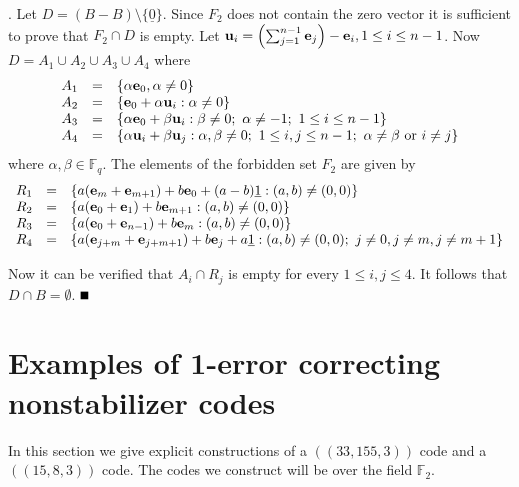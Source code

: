 \documentclass{Rinton-P9x6}
\newcommand{\GF}[2][]{{\ensuremath{\mathbb{F}_{#2}^{#1}}}}
\newcommand{\bproof}{\noindent{\it Proof}}
\newcommand{\eproof}{\hspace*{\fill}$\rule{2mm}{2mm}$~~~~~\bigskip}
\renewenvironment{proof}{\bproof. }{\eproof}
\newcommand{\e}{{\bf e}}
\renewcommand{\u}{{\bf u}}
\begin{document}
\begin{proof}
  Let $D = (B - B ) \setminus \{ \underline{0} \}$.  Since $F_2$ does
  not contain the zero vector it is sufficient to prove that $F_2 \cap
  D$ is empty. Let $\u_i = \left(\sum_{j=1}^{n-1} \e_j\right) - \e_i, 1 \leq i \leq
  n-1$.  Now $D = A_1 \cup A_2 \cup A_3 \cup A_4$ where
  \[
  \begin{array}{ccl}
    A_1 &=& \{ \alpha \e_0 , \alpha \ne 0 \} \\
    A_2 &=& \{ \e_0 + \alpha \u_i : \alpha \ne 0 \} \\
    A_3 &=& \{ \alpha \e_0 + \beta \u_i : \beta \ne 0;\ \alpha \ne -1 ;\ 1\leq i \leq n - 1 \}\\
    A_4 &=& \{ \alpha \u_i + \beta \u_j: \alpha,\beta \ne 0;\ 1 \leq i,j \leq n - 1;\
     \alpha \ne \beta \textrm{ or } i \ne j\}
  \end{array}
  \]
  where $\alpha,\beta \in \GF{q}$. The elements of the forbidden set
  $F_2$ are given by
  \[
  \begin{array}{ccl}
    R_1 &=& \{ a (\e_m + \e_{m+1}) + b \e_0 + (a-b)\underline{1} : (a,b) \ne (0,0) \}\\
    R_2 &=& \{ a ( \e_0 + \e_1 ) + b \e_{m+1} : (a,b) \ne (0,0) \}\\
    R_3 &=& \{ a (\e_0 + \e_{n-1} ) + b \e_m : (a,b) \neq (0,0) \}\\
    R_4 &=& \{ a (\e_{j+m} + \e_{j+m+1}) + b \e_j + a \underline{1} : (a,b) \ne (0,0);\
                                                                    j \ne 0, j\ne m, j \ne m+1 \}
  \end{array}
  \]
  
  Now it can be verified that $A_i \cap R_j$ is empty for every $1
  \leq i,j \leq 4$. It follows that $D\cap B=\emptyset$.
\end{proof}

\section{Examples of 1-error correcting nonstabilizer codes}

In this section we give explicit constructions of a $((33,155,3))$
code and a $((15,8,3))$ code. The codes we construct will be over the
field $\GF{2}$.
\end{document}
